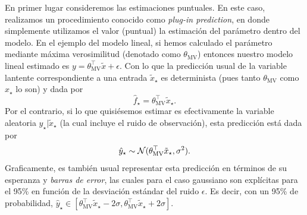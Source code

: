 En primer lugar consideremos las estimaciones puntuales. En este caso, realizamos un procedimiento conocido como \emph{plug-in prediction}, en donde simplemente utilizamos el valor (puntual) la estimación del parámetro dentro del modelo. En el ejemplo del modelo lineal, si hemos calculado el parámetro mediante máxima verosimilitud (denotado como $\theta_{\text{MV}}$) entonces nuestro modelo lineal estimado es $y = \theta_{\text{MV}}^\top \tilde{x} + \epsilon$. Con lo que la predicción usual de la variable lantente correspondiente a una entrada $\tilde{x}_\star$ es determinista (pues tanto $\theta_{\text{MV}}$ como $x_\star$ lo son) y dada por
\begin{equation}
	\hat f_\star = \theta_{\text{MV}}^\top \tilde{x}_\star.
\end{equation}
Por el contrario, si lo que quisiésemos estimar es efectivamente la variable aleatoria $y_\star|\tilde{x}_\star$ (la cual incluye el ruido de observación), esta predicción está dada por 
\begin{equation}
	\hat y_\star \sim {\mathcal N}(\theta_{\text{MV}}^\top \tilde{x}_\star,\sigma^2). 
\end{equation}
Graficamente, es también usual representar esta predicción en términos de su esperanza y \emph{barras de error}, las cuales para el caso gaussiano son explícitas para el 95\% en función de la desviación estándar del ruido $\epsilon$. Es decir, con un 95\% de probabilidad, $\hat y_\star\in[\theta_{\text{MV}}^\top \tilde{x}_\star - 2\sigma,\theta_{\text{MV}}^\top \tilde{x}_\star + 2\sigma]$. 

